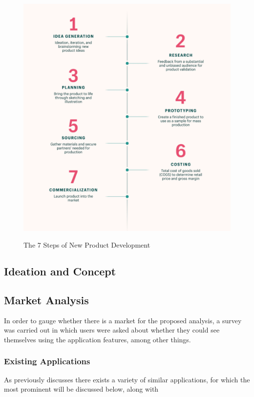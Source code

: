 \documentclass[12pt]{article}
\begin{document}
	\begin{figure}[H]
		\centering
		\includegraphics[scale=0.15]{images/npd.png}
		\caption{The 7 Steps of New Product Development}
		\label{fig:npd} \cite{shopify}
	\end{figure}
	
	
	\subsection{Ideation and Concept}
	\blindtext
	
	\subsection{Market Analysis}
	In order to gauge whether there is a market for the proposed analysis, a survey was carried out in which users were asked about whether they could see themselves using the application features, among other things.
	
	\subsubsection{Existing Applications}
	As previously discusses there exists a variety of similar applications, for which the most prominent will be discussed below, along with
	
\end{document}

